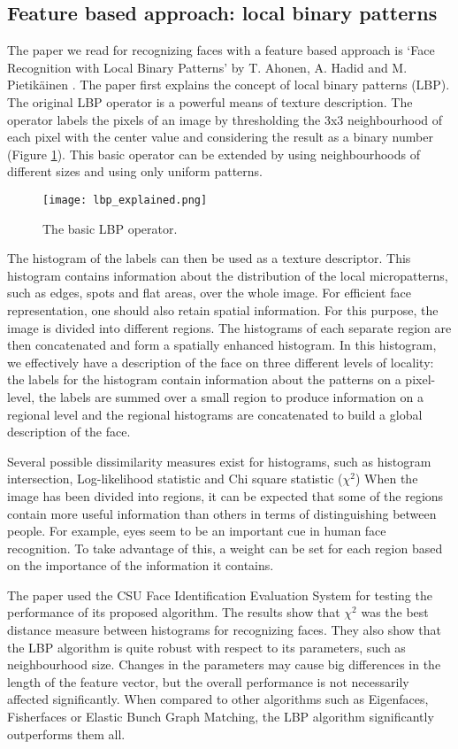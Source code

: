 \documentclass[]{article}
\begin{document}
\subsection{Feature based approach: local binary patterns}
The paper we read for recognizing faces with a feature based approach is `Face Recognition with Local Binary Patterns' by T. Ahonen, A. Hadid and M. Pietikäinen \cite{ahonen2004face}.
The paper first explains the concept of local binary patterns (LBP). The original LBP operator is a powerful means of texture description. The operator labels the pixels of an image by thresholding the 3x3 neighbourhood of each pixel with the center value and considering the result as a binary number (Figure \ref{fig:lbp-explained}). This basic operator can be extended by using neighbourhoods of different sizes and using only uniform patterns.
\begin{figure}
\centering
\texttt{[image: lbp\_explained.png]}
\caption{The basic LBP operator.}
\label{fig:lbp-explained}
\end{figure}

The histogram of the labels can then be used as a texture descriptor. This histogram contains information about the distribution of the local micropatterns, such as edges, spots and flat areas, over the whole image. For efficient face representation, one should also retain spatial information. For this purpose, the image is divided into different regions. The histograms of each separate region are then concatenated and form a spatially enhanced histogram. In this histogram, we effectively have a description of the face on three different levels of locality: the labels for the histogram contain information about the patterns on a pixel-level, the labels are summed over a small region to produce information on a regional level and the regional histograms are concatenated to build a global description of the face.

Several possible dissimilarity measures exist for histograms, such as histogram intersection, Log-likelihood statistic and Chi square statistic ($\chi^2$) When the image has been divided into regions, it can be expected that some of the regions contain more useful information than others in terms of distinguishing between people. For example, eyes seem to be an important cue in human face recognition. To take advantage of this, a weight can be set for each region based on the importance of the information it contains. 

The paper used the CSU Face Identification Evaluation System for testing the performance of its proposed algorithm. The results show that $\chi^2$ was the best distance measure between histograms for recognizing faces. They also show that the LBP algorithm is quite robust with respect to its parameters, such as neighbourhood size. Changes in the parameters may cause big differences in the length of the feature vector, but the overall performance is not necessarily affected significantly. When compared to other algorithms such as Eigenfaces, Fisherfaces or Elastic Bunch Graph Matching, the LBP algorithm significantly outperforms them all.
\end{document}
